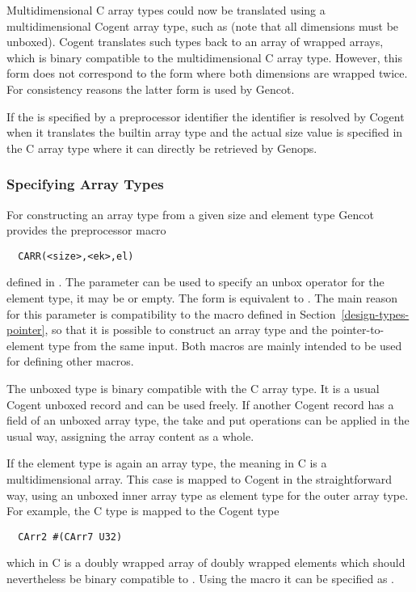Multidimensional C array types could now be translated using a multidimensional Cogent array type, such as 
 (note that all dimensions must be unboxed). Cogent translates such types back
to an array of wrapped arrays, which is binary compatible to the multidimensional C array type. However, 
this form does not correspond to the form 
where both dimensions are wrapped twice. For consistency reasons the latter form is used by Gencot.

If the  is specified by a preprocessor identifier the identifier is resolved by Cogent when it translates the builtin
array type and the actual size value is specified in the C array type where it can directly be retrieved by Genops.

\subsubsection{Specifying Array Types}

For constructing an array type from a given size and element type Gencot provides the preprocessor macro
\begin{verbatim}
  CARR(<size>,<ek>,el)
\end{verbatim}
defined in . The parameter  can be used to specify an unbox
operator for the element type, it may be  or empty. The form  is equivalent
to . The main reason for this parameter is compatibility to the macro 
defined in Section~\ref{design-types-pointer}, so that it is possible to construct an array type and the 
pointer-to-element type from the same input. Both macros are mainly intended to be used for defining other
macros.

The unboxed type  is binary compatible with the C array type.
It is a usual Cogent unboxed record and can be used freely. 
If another Cogent record has a field of an unboxed array type, the take and put operations can be applied
in the usual way, assigning the array content as a whole.

If the element type  is again an array type, the meaning in C is a multidimensional array.
This case is mapped to Cogent in the straightforward way, using an unboxed inner array type as element type
for the outer array type. For example, the C type  is mapped to the Cogent type
\begin{verbatim}
  CArr2 #(CArr7 U32)
\end{verbatim}
which in C is a doubly wrapped array of doubly wrapped elements which should nevertheless be binary compatible 
to . Using the macro  it can be specified as .

